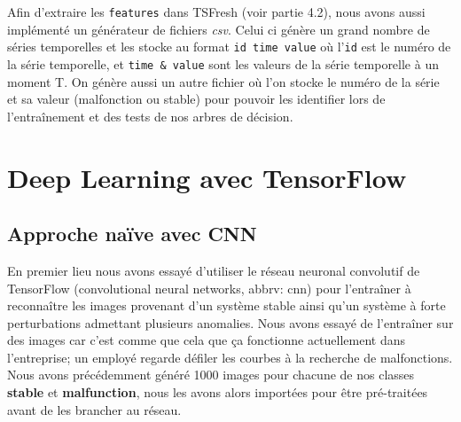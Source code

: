 \documentclass[french]{article}
\theoremstyle{mytheoremstyle}
\theoremstyle{mytheoremstyle}
\theoremstyle{myproblemstyle}
\begin{document}
        Afin d'extraire les \texttt{features} dans TSFresh (voir partie 4.2), nous avons aussi implémenté un générateur de fichiers \emph{csv}. Celui ci génère un grand nombre de séries temporelles et les stocke au format \texttt{id \/ time \/ value} où l'\texttt{id} est le numéro de la série temporelle, et \texttt{time \& value} sont les valeurs de la série temporelle à un moment T. On génère aussi un autre fichier où l'on stocke le numéro de la série et sa valeur (malfonction ou stable) pour pouvoir les identifier lors de l'entraînement et des tests de nos arbres de décision.
        
        
        
        
    \section{Deep Learning avec TensorFlow}
        \subsection{Approche naïve avec CNN}
       En premier lieu nous avons essayé d'utiliser le réseau neuronal convolutif de TensorFlow (convolutional neural networks, abbrv: cnn) pour l'entraîner à reconnaître les images provenant d'un système stable ainsi qu'un système à forte perturbations admettant plusieurs anomalies. Nous avons essayé de l'entraîner sur des images car c'est comme que cela que ça fonctionne actuellement dans l'entreprise; un employé regarde défiler les courbes à la recherche de malfonctions. Nous avons précédemment généré 1000 images pour chacune de nos classes \textbf{stable} et \textbf{malfunction}, nous les avons alors importées pour être pré-traitées avant de les brancher au réseau.
       
\end{document}
